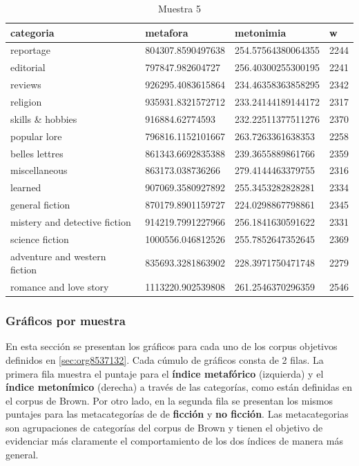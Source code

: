 \documentclass[12pt,letterpaper,twoside]{article}
\begin{document}
\begin{center}
\begin{longtable}{| p{} | p{} | p{}|p{}|}
\caption{Muestra 5}
    \hline
        categoria & metafora & metonimia & w \\ \hline
        reportage & 804307.8590497638 & 254.57564380064355 & 2244 \\ \hline
        editorial & 797847.982604727 & 256.40300255300195 & 2241 \\ \hline
        reviews & 926295.4083615864 & 234.46358363858295 & 2342 \\ \hline
        religion & 935931.8321572712 & 233.24144189144172 & 2317 \\ \hline
        skills \& hobbies & 916884.62774593 & 232.22511377511276 & 2370 \\ \hline
        popular lore & 796816.1152101667 & 263.7263361638353 & 2258 \\ \hline
        belles lettres & 861343.6692835388 & 239.3655889861766 & 2359 \\ \hline
        miscellaneous & 863173.038736266 & 279.4144463379755 & 2316 \\ \hline
        learned & 907069.3580927892 & 255.3453282828281 & 2334 \\ \hline
        general fiction & 870179.8901159727 & 224.0298867798861 & 2345 \\ \hline
        mistery and detective fiction & 914219.7991227966 & 256.1841630591622 & 2331 \\ \hline
        science fiction & 1000556.046812526 & 255.7852647352645 & 2369 \\ \hline
        adventure and western fiction & 835693.3281863902 & 228.3971750471748 & 2279 \\ \hline
        romance and love story & 1113220.902539808 & 261.2546370296359 & 2546 \\ \hline
\end{longtable}
    \label{muestra5}
\end{center}

\normalsize
\subsubsection{Gráficos por muestra}
\label{sec:org66a5e7c}
En esta sección se presentan los gráficos para cada uno de los corpus objetivos
definidos en \ref{sec:org8537132}. Cada cúmulo de gráficos consta de 2 filas.
La primera fila muestra el puntaje para el \textbf{índice metafórico} (izquierda) y
el \textbf{índice metonímico} (derecha) a través de las categorías, como están
definidas en el corpus de Brown. Por otro lado, en la segunda fila
se presentan los mismos puntajes para las metacategorías de de \textbf{ficción}
y \textbf{no ficción}. Las metacategorias son agrupaciones de categorías del corpus
de Brown y tienen el objetivo de evidenciar más claramente el comportamiento
de los dos índices de manera más general.
\end{document}
